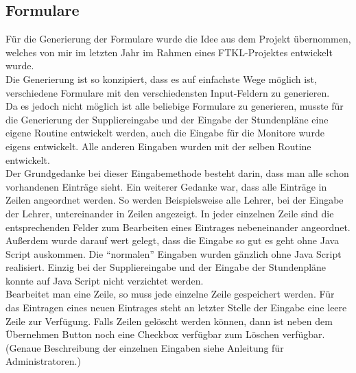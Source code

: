 \subsection{Formulare} \label{sec:content_draft_form}
Für die Generierung der Formulare wurde die Idee aus dem Projekt übernommen, welches von mir im letzten Jahr im Rahmen eines FTKL-Projektes entwickelt wurde.\\
Die Generierung ist so konzipiert, dass es auf einfachste Wege möglich ist, verschiedene Formulare mit den verschiedensten Input-Feldern zu generieren.\\
Da es jedoch nicht möglich ist alle beliebige Formulare zu generieren, musste für die Generierung der Suppliereingabe und der Eingabe der Stundenpläne eine eigene Routine entwickelt werden, auch die Eingabe für die Monitore wurde eigens entwickelt. Alle anderen Eingaben wurden mit der selben Routine entwickelt.\\
Der Grundgedanke bei dieser Eingabemethode besteht darin, dass man alle schon vorhandenen Einträge sieht. Ein weiterer Gedanke war, dass alle Einträge in Zeilen angeordnet werden. So werden Beispielsweise alle Lehrer, bei der Eingabe der Lehrer, untereinander in Zeilen angezeigt. In jeder einzelnen Zeile sind die entsprechenden Felder zum Bearbeiten eines Eintrages nebeneinander angeordnet. Außerdem wurde darauf wert gelegt, dass die Eingabe so gut es geht ohne Java Script auskommen. Die \enquote{normalen} Eingaben wurden gänzlich ohne Java Script realisiert. Einzig bei der Suppliereingabe und der Eingabe der Stundenpläne konnte auf Java Script nicht verzichtet werden.\\
Bearbeitet man eine Zeile, so muss jede einzelne Zeile gespeichert werden. Für das Eintragen eines neuen Eintrages steht an letzter Stelle der Eingabe eine leere Zeile zur Verfügung. Falls Zeilen gelöscht werden können, dann ist neben dem Übernehmen Button noch eine Checkbox verfügbar zum Löschen verfügbar. (Genaue Beschreibung der einzelnen Eingaben siehe Anleitung für Administratoren.)\\
